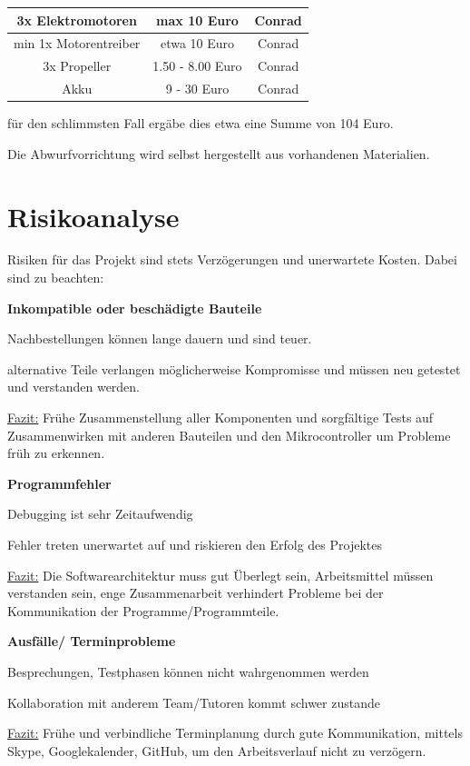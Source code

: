 \documentclass[lang=ngerman,inputenc=utf8,fontsize=10pt]{ldvarticle}
\begin{document}
\begin{tabular}{|c|c|c|}
\hline
3x Elektromotoren & max 10 Euro & Conrad \\
\hline
min 1x Motorentreiber & etwa 10 Euro & Conrad \\
\hline
3x Propeller & 1.50 - 8.00 Euro & Conrad \\
\hline
Akku & 9 - 30 Euro & Conrad \\
\hline
\end{tabular}

für den schlimmsten Fall ergäbe dies etwa eine Summe von 104 Euro.

Die Abwurfvorrichtung wird selbst hergestellt aus vorhandenen Materialien.




\section{Risikoanalyse}

Risiken für das Projekt sind stets Verzögerungen und unerwartete Kosten. Dabei sind zu beachten:

\textbf{Inkompatible oder beschädigte Bauteile}
\begin{list}{->}{}
\item Nachbestellungen können lange dauern und sind teuer.
\item alternative Teile verlangen möglicherweise Kompromisse und müssen neu getestet und verstanden werden.
\end{list}
\underline{Fazit:} Frühe Zusammenstellung aller Komponenten und sorgfältige Tests auf Zusammenwirken mit anderen Bauteilen und den Mikrocontroller um Probleme früh zu erkennen.


\textbf{Programmfehler}
\begin{list}{->}{}
\item Debugging ist sehr Zeitaufwendig
\item Fehler treten unerwartet auf und riskieren den Erfolg des Projektes
\end{list}

\underline{Fazit:} Die Softwarearchitektur muss gut Überlegt sein, Arbeitsmittel müssen verstanden sein, enge Zusammenarbeit verhindert Probleme bei der Kommunikation der Programme/Programmteile.


\textbf{Ausfälle/ Terminprobleme}
\begin{list}{->}{}
\item Besprechungen, Testphasen können nicht wahrgenommen werden
\item Kollaboration mit anderem Team/Tutoren kommt schwer zustande
\end{list}
\underline{Fazit:} Frühe und verbindliche Terminplanung durch gute Kommunikation, mittels Skype, Googlekalender, GitHub, um den Arbeitsverlauf nicht zu verzögern.
\end{document}
